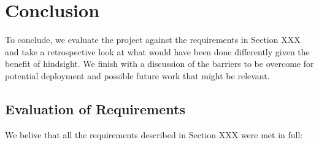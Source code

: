 \chapter{Conclusion}\label{ch:conclusion}

To conclude, we evaluate the project against the requirements in Section XXX and take a retrospective look at what would have been done differently given the benefit of hindsight. We finish with a discussion of the barriers to be overcome for potential deployment and possible future work that might be relevant.

\section{Evaluation of Requirements}
\label{sec:eval-require}

We belive that all the requirements described in Section XXX were met in full:

